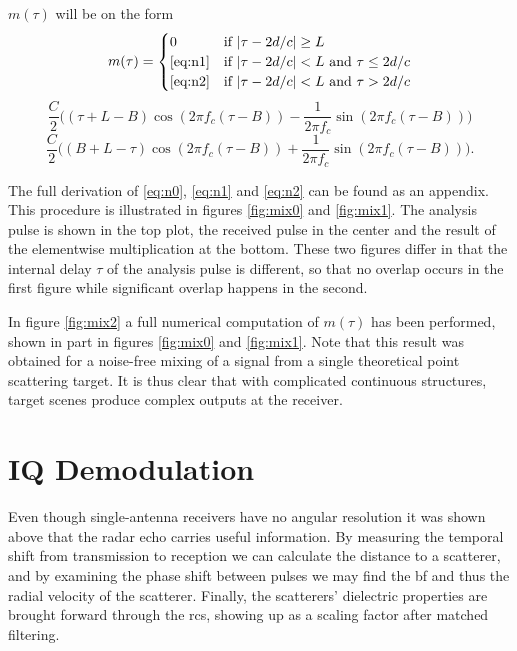 \noindent $m(\tau)$ will be on the form 
\begin{equation}\label{eq:n0}
	m(\tau) = 
	\begin{cases}
		0 & \text{if $|\tau-2d/c|\geq L$} \\
		\text{\eqref{eq:n1}} & \text{if $|\tau-2d/c|<L$ and $\tau \leq 2d/c$} \\
		\text{\eqref{eq:n2}} & \text{if $|\tau-2d/c|<L$ and $\tau > 2d/c$}
	\end{cases}
\end{equation}
\begin{equation}\label{eq:n1}
	\frac{C}{2}\Big((\tau + L - B)\cos(2\pi f_c(\tau - B)) 
	- \frac{1}{2\pi f_c}\sin(2\pi f_c(\tau - B))\Big)
\end{equation}
\begin{equation}\label{eq:n2}
	\frac{C}{2}\Big((B + L - \tau)\cos(2\pi f_c(\tau - B)) 
	+ \frac{1}{2\pi f_c}\sin(2\pi f_c(\tau - B))\Big).
\end{equation}

The full derivation of \eqref{eq:n0}, \eqref{eq:n1} and \eqref{eq:n2} can be found as an appendix. This procedure is illustrated in figures \ref{fig:mix0} and \ref{fig:mix1}. The analysis pulse is shown in the top plot, the received pulse in the center and the result of the elementwise multiplication at the bottom. These two figures differ in that the internal delay $\tau$ of the analysis pulse is different, so that no overlap occurs in the first figure while significant overlap happens in the second.

In figure \ref{fig:mix2} a full numerical computation of $m(\tau)$ has been performed, shown in part in figures \ref{fig:mix0} and \ref{fig:mix1}. Note that this result was obtained for a noise-free mixing of a signal from a single theoretical point scattering target. It is thus clear that with complicated continuous structures, target scenes produce complex outputs at the receiver.

\section{IQ Demodulation}
\label{sec:iq}

Even though single-antenna receivers have no angular resolution it was shown above that the radar echo carries useful information. By measuring the temporal shift from transmission to reception we can calculate the distance to a scatterer, and by examining the phase shift between pulses we may find the \gls{bf} and thus the radial velocity of the scatterer. Finally, the scatterers' dielectric properties are brought forward through the \gls{rcs}, showing up as a scaling factor after matched filtering. 

